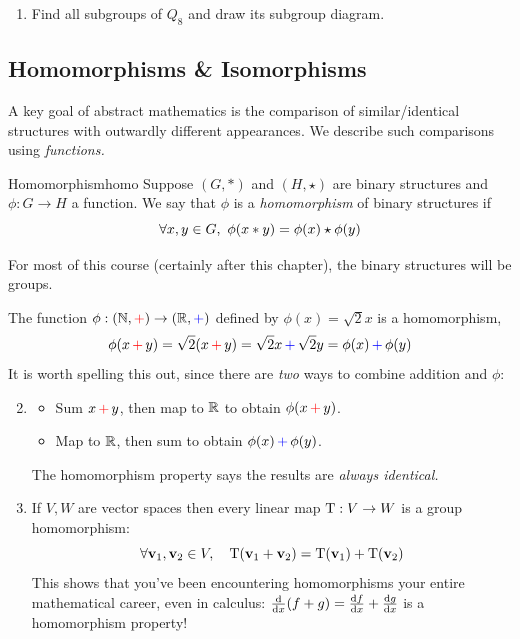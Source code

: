 \begin{exercises}
\begin{enumerate}
\begin{enumerate}
  	\item Find all subgroups of $Q_8$ and draw its subgroup diagram.
	\end{enumerate}
 
\end{enumerate}
\end{exercises}


\clearpage



\subsection{Homomorphisms \& Isomorphisms}\label{sec:morph}

A key goal of abstract mathematics is the comparison of similar/identical structures with outwardly different appearances. We describe such comparisons using \emph{functions.}

\begin{defn}{Homomorphism}{homo}
Suppose $(G,\ast)$ and $(H,\star)$ are binary structures and $\phi:G\to H$ a function. We say that $\phi$ is a \emph{homomorphism} of binary structures if
\[\forall x,y\in G,\ \phi(x\opast y)=\phi(x)\opstar\phi(y)\]
\end{defn}

For most of this course (certainly after this chapter), the binary structures will be groups.



\begin{examples}{}{}
\exstart The%
\def\opbl{\operatorname{\textcolor{blue}{+}}}
\def\oprd{\operatorname{\textcolor{red}{+}}} 
function $\phi:(\N,\textcolor{red}{+})\to(\R,\textcolor{blue}{+})$ defined by $\phi(x)=\sqrt 2x$ is a homomorphism,\vspace{-2pt}
\[\phi(x\oprd y)=\sqrt 2(x\oprd y)=\sqrt 2x\opbl \sqrt 2y=\phi(x)\opbl \phi(y)\]
It is worth spelling this out, since there are \emph{two} ways to combine addition and $\phi$:\vspace{-5pt}
\begin{enumerate}\setcounter{enumi}{1}\itemsep2pt
  \item[]\begin{itemize}
  	\item Sum $x\oprd y$, then map to $\R$ to obtain $\phi(x\oprd y)$.
  	\item Map to $\R$, then sum to obtain $\phi(x)\opbl\phi(y)$.
	\end{itemize}
	The homomorphism property says the results are \emph{always identical.}
	
  \item If $V,W$ are vector spaces then every linear map $\rT:V\to W$ is a group homomorphism:\footnotemark
  \[\forall\vv_1,\vv_2\in V,\quad \rT(\vv_1+\vv_2)=\rT(\vv_1)+\rT(\vv_2)\]
  This shows that you've been encountering homomorphisms your entire mathematical career, even in calculus: $\diff x(f+g)=\diff[f]{x}+\diff[g]{x}$ is a homomorphism property! 
\end{enumerate}
\end{examples}


